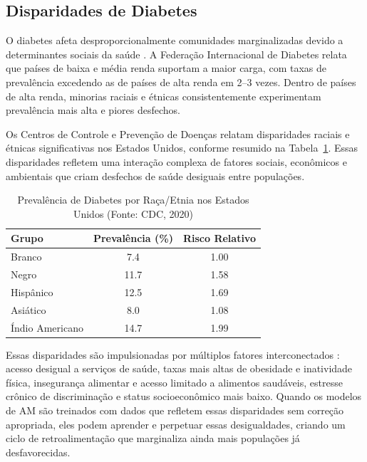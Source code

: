 \subsection{Disparidades de Diabetes}

O diabetes afeta desproporcionalmente comunidades marginalizadas devido a 
determinantes sociais da saúde \cite{narayan2017}. A Federação Internacional 
de Diabetes \cite{idf2021} relata que países de baixa e média renda suportam 
a maior carga, com taxas de prevalência excedendo as de países de alta 
renda em 2--3 vezes. Dentro de países de alta renda, minorias raciais e 
étnicas consistentemente experimentam prevalência mais alta e piores 
desfechos.

Os Centros de Controle e Prevenção de Doenças \cite{cdc2020} relatam 
disparidades raciais e étnicas significativas nos Estados Unidos, conforme 
resumido na Tabela~\ref{tab:diabetes_disparities}. Essas disparidades 
refletem uma interação complexa de fatores sociais, econômicos e ambientais 
que criam desfechos de saúde desiguais entre populações.

\begin{table}[H]
\centering
\caption{Prevalência de Diabetes por Raça/Etnia nos Estados Unidos 
(Fonte: CDC, 2020)}
\begin{tabular}{lcc}
\toprule
\textbf{Grupo} & \textbf{Prevalência (\%)} & \textbf{Risco Relativo} \\
\midrule
Branco & 7.4 & 1.00 \\
Negro & 11.7 & 1.58 \\
Hispânico & 12.5 & 1.69 \\
Asiático & 8.0 & 1.08 \\
Índio Americano & 14.7 & 1.99 \\
\bottomrule
\end{tabular}
\label{tab:diabetes_disparities}
\end{table}

Essas disparidades são impulsionadas por múltiplos fatores interconectados 
\cite{hill2022}: acesso desigual a serviços de saúde, taxas mais altas 
de obesidade e inatividade física, insegurança alimentar e acesso limitado 
a alimentos saudáveis, estresse crônico de discriminação e status 
socioeconômico mais baixo. Quando os modelos de AM são treinados com dados 
que refletem essas disparidades sem correção apropriada, eles podem aprender 
e perpetuar essas desigualdades, criando um ciclo de retroalimentação que 
marginaliza ainda mais populações já desfavorecidas.


